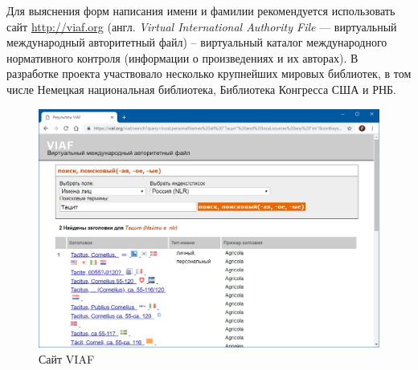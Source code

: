 Для выяснения форм написания имени и фамилии рекомендуется использовать сайт \underline{http://viaf.org} (англ. \emph{Virtual International Authority File} — виртуальный международный авторитетный файл) -- виртуальный каталог международного нормативного контроля (информации о произведениях и их авторах). В разработке проекта участвовало несколько крупнейших мировых библиотек, в том числе Немецкая национальная библиотека, Библиотека Конгресса США и РНБ.

\begin{figure}
    \centering
    \includegraphics[width=\linewidth]{img/viaf}
    \caption{Сайт VIAF}
    \label{fig:viaf}
\end{figure}

